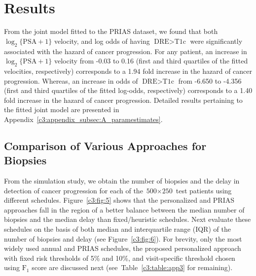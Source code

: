 
\section{Results}
\label{c3:sec:results}
From the joint model fitted to the PRIAS dataset, we found that both $\log_2 \{\mbox{PSA} + 1\}$ velocity, and log odds of having $\mbox{DRE} > \mbox{T1c}$ were significantly associated with the hazard of cancer progression. For any patient, an increase in $\log_2 \{\mbox{PSA} + 1\}$ velocity from -0.03 to 0.16 (first and third quartiles of the fitted velocities, respectively) corresponds to a 1.94 fold increase in the hazard of cancer progression. Whereas, an increase in odds of $\mbox{DRE} > \mbox{T1c}$ from -6.650 to -4.356 (first and third quartiles of the fitted log-odds, respectively) corresponds to a 1.40 fold increase in the hazard of cancer progression. Detailed results pertaining to the fitted joint model are presented in Appendix~\ref{c3:appendix_subsec:A_paramestimates}.

\subsection{Comparison of Various Approaches for Biopsies}
From the simulation study, we obtain the number of biopsies and the delay in detection of cancer progression for each of the ${\mbox{500} \times \mbox{250}}$ test patients using different schedules. Figure~\ref{c3:fig:5} shows that the personalized and PRIAS approaches fall in the region of a better balance between the median number of biopsies and the median delay than fixed/heuristic schedules. Next evaluate these schedules on the basis of both median and interquartile range (IQR) of the number of biopsies and delay (see Figure~\ref{c3:fig:6}). For brevity, only the most widely used annual and PRIAS schedules, the proposed personalized approach with fixed risk thresholds of 5\% and 10\%, and visit-specific threshold chosen using $\mbox{F}_1$ score are discussed next (see~Table~\ref{c3:table:app3} for remaining).

